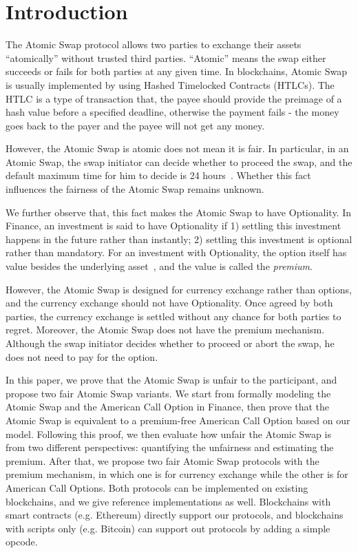 \section{Introduction}
\label{sec:intro}

The Atomic Swap protocol allows two parties to exchange their assets ``atomically'' without trusted third parties.
``Atomic'' means the swap either succeeds or fails for both parties at any given time.
In blockchains, Atomic Swap is usually implemented by using Hashed Timelocked Contracts (HTLCs).
The HTLC is a type of transaction that, the payee should provide the preimage of a hash value before a specified deadline, otherwise the payment fails - the money goes back to the payer and the payee will not get any money.

However, the Atomic Swap is atomic does not mean it is fair.
In particular, in an Atomic Swap, the swap initiator can decide whether to proceed the swap, and the default maximum time for him to decide is 24 hours~\cite{nolan2013alt}.
Whether this fact influences the fairness of the Atomic Swap remains unknown.

We further observe that, this fact makes the Atomic Swap to have Optionality.
In Finance, an investment is said to have Optionality if 1) settling this investment happens in the future rather than instantly; 2) settling this investment is optional rather than mandatory.
For an investment with Optionality, the option itself has value besides the underlying asset~\cite{higham2004introduction}, and the value is called the \textit{premium}.

However, the Atomic Swap is designed for currency exchange rather than options, and the currency exchange should not have Optionality.
Once agreed by both parties, the currency exchange is settled without any chance for both parties to regret.
Moreover, the Atomic Swap does not have the premium mechanism.
Although the swap initiator decides whether to proceed or abort the swap, he does not need to pay for the option.

In this paper, we prove that the Atomic Swap is unfair to the participant, and propose two fair Atomic Swap variants.
We start from formally modeling the Atomic Swap and the American Call Option in Finance,
then prove that the Atomic Swap is equivalent to a premium-free American Call Option based on our model.
Following this proof, we then evaluate how unfair the Atomic Swap is from two different perspectives: quantifying the unfairness and estimating the premium.
After that, we propose two fair Atomic Swap protocols with the premium mechanism, in which one is for currency exchange while the other is for American Call Options.
Both protocols can be implemented on existing blockchains, and we give reference implementations as well.
Blockchains with smart contracts (e.g. Ethereum) directly support our protocols, and blockchains with scripts only (e.g. Bitcoin) can support out protocols by adding a simple opcode.




